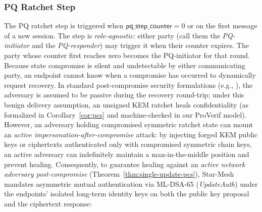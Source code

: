 \documentclass[11pt,a4paper]{article}
\theoremstyle{remark}
\theoremstyle{plain}
\begin{document}
\subsubsection{PQ Ratchet Step}
\label{sec:pqratchet}

The PQ ratchet step is triggered when $\mathsf{pq\_step\_counter} = 0$ or on the first message
of a new session.  The step is \emph{role-agnostic}: either party (call them the
\emph{PQ-initiator} and the \emph{PQ-responder}) may trigger it when their counter expires.
The party whose counter first reaches zero becomes the PQ-initiator for that round.
Because state compromise is silent and undetectable by either communicating party, an endpoint
cannot know when a compromise has occurred to dynamically request recovery.
In standard post-compromise security formulations (e.g., \cite{cohngordon2016,alwen2019doubleratchet}),
the adversary is assumed to be passive during the recovery round-trip; under this benign delivery assumption,
an unsigned KEM ratchet heals confidentiality (as formalized in Corollary~\ref{cor:pcs} and machine-checked in our ProVerif model).
However, an adversary holding compromised symmetric ratchet state can mount an \emph{active impersonation-after-compromise}
attack: by injecting forged KEM public keys or ciphertexts authenticated only with compromised symmetric chain keys,
an active adversary can indefinitely maintain a man-in-the-middle position and prevent healing.
Consequently, to guarantee healing against an \emph{active network adversary post-compromise} (Theorem~\ref{thm:single-update-pcs}),
Star-Mesh mandates asymmetric mutual authentication via ML-DSA-65 (\emph{UpdateAuth}) under the endpoints' isolated long-term identity keys
on both the public key proposal and the ciphertext response:
\end{document}
